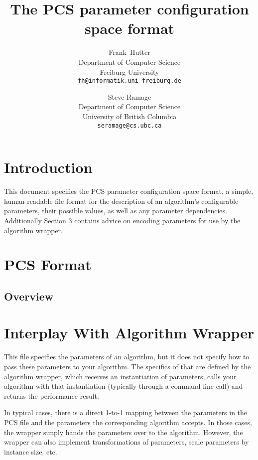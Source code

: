 \documentclass[11pt,letterpaper,oneside]{article}
\begin{document}
\title{The PCS parameter configuration space format}

\author{
Frank~Hutter\\ 
Department of Computer Science\\
Freiburg University\\
\texttt{fh@informatik.uni-freiburg.de}
\and
Steve Ramage\\
Department of Computer Science\\
University of British Columbia\\
\texttt{seramage@cs.ubc.ca}
}

\maketitle

\section{Introduction}

\noindent{}This document specifies the PCS parameter configuration space format, a simple, 
human-readable file format for the description of an algorithm's configurable parameters, 
their possible values, as well as any parameter dependencies. Additionally Section \ref{sec:tips} contains advice on encoding parameters for use by the algorithm wrapper.
%
\section{PCS Format}
\subsection{Overview}


\section{Interplay With Algorithm Wrapper}\label{sec:tips}
This file specifies the parameters of an algorithm, but it does not specify how to pass these parameters to your algorithm.
The specifics of that are defined by the algorithm wrapper, which receives an instantiation of parameters,
calls your algorithm with that instantiation (typically through a command line call) and returns the performance result. 

In typical cases, there is a direct 1-to-1 mapping between the parameters in the PCS file and the parameters the corresponding algorithm accepts.
In those cases, the wrapper simply hands the parameters over to the algorithm.
However, the wrapper can also implement transformations of parameters, scale parameters by instance size, etc. 
\end{document}
